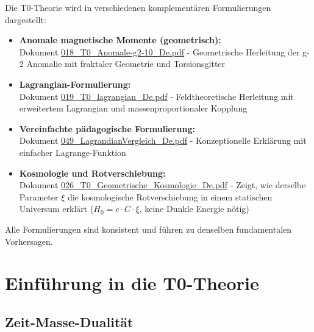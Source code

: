 	
	\begin{tcolorbox}[colback=blue!10!white, colframe=blue!75!black, title=Verweise auf komplementäre T0-Formulierungen]
		Die T0-Theorie wird in verschiedenen komplementären Formulierungen dargestellt:
		
		\begin{itemize}
			\item \textbf{Anomale magnetische Momente (geometrisch):} \\
			Dokument \href{https://github.com/jpascher/T0-Time-Mass-Duality/blob/main/2/pdf/018_T0_Anomale-g2-10_De.pdf}{018\_T0\_Anomale-g2-10\_De.pdf} - 
			Geometrische Herleitung der g-2 Anomalie mit fraktaler Geometrie und Torsionsgitter
			
			\item \textbf{Lagrangian-Formulierung:} \\
			Dokument \href{https://github.com/jpascher/T0-Time-Mass-Duality/blob/main/2/pdf/019_T0_lagrangian_De.pdf}{019\_T0\_lagrangian\_De.pdf} - 
			Feldtheoretische Herleitung mit erweitertem Lagrangian und massenproportionaler Kopplung
			
			\item \textbf{Vereinfachte pädagogische Formulierung:} \\
			Dokument \href{https://github.com/jpascher/T0-Time-Mass-Duality/blob/main/2/pdf/049_LagrandianVergleich_De.pdf}{049\_LagrandianVergleich\_De.pdf} - 
			Konzeptionelle Erklärung mit einfacher Lagrange-Funktion
			
			\item \textbf{Kosmologie und Rotverschiebung:} \\
			Dokument \href{https://github.com/jpascher/T0-Time-Mass-Duality/blob/main/2/pdf/026_T0_Geometrische_Kosmologie_De.pdf}{026\_T0\_Geometrische\_Kosmologie\_De.pdf} - 
			Zeigt, wie derselbe Parameter $\xi$ die kosmologische Rotverschiebung in einem statischen Universum erklärt ($H_0 = c \cdot C \cdot \xi$, keine Dunkle Energie nötig)
		\end{itemize}
		
		Alle Formulierungen sind konsistent und führen zu denselben fundamentalen Vorhersagen.
	\end{tcolorbox}
	
	
	\section{Einführung in die T0-Theorie}
	
	\subsection{Zeit-Masse-Dualität}
	
